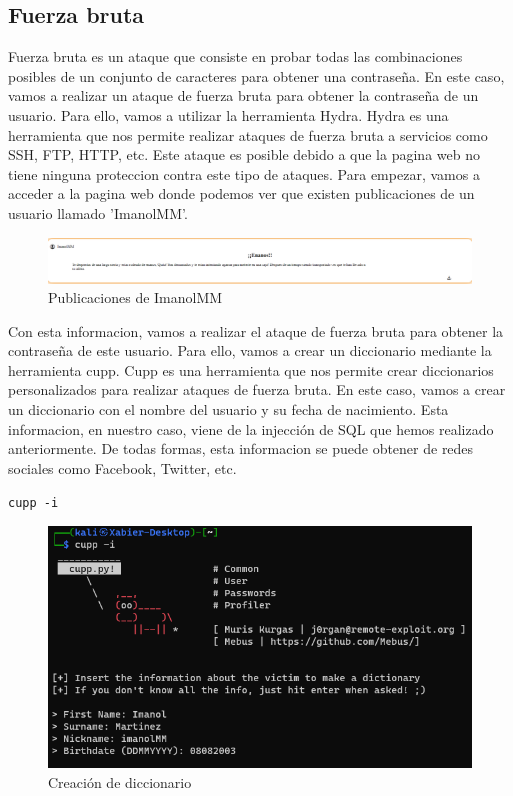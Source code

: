 \documentclass{report}
\begin{document}
            \subsection{Fuerza bruta}
                Fuerza bruta es un ataque que consiste en probar todas las combinaciones posibles de un conjunto de caracteres para obtener una contraseña.
                En este caso, vamos a realizar un ataque de fuerza bruta para obtener la contraseña de un usuario.
                Para ello, vamos a utilizar la herramienta Hydra.
                Hydra es una herramienta que nos permite realizar ataques de fuerza bruta a servicios como SSH, FTP, HTTP, etc.
                Este ataque es posible debido a que la pagina web no tiene ninguna proteccion contra este tipo de ataques.
                Para empezar, vamos a acceder a la pagina web donde podemos ver que existen publicaciones de un usuario llamado 'ImanolMM'.
                \begin{figure}[H]
                    \centering
                    \includegraphics[width=1\textwidth]{./img/vulnerabilidades/2.4/3.1.png}
                    \caption{Publicaciones de ImanolMM}
                \end{figure}
                Con esta informacion, vamos a realizar el ataque de fuerza bruta para obtener la contraseña de este usuario.
                Para ello, vamos a crear un diccionario mediante la herramienta cupp.
                Cupp es una herramienta que nos permite crear diccionarios personalizados para realizar ataques de fuerza bruta.
                En este caso, vamos a crear un diccionario con el nombre del usuario y su fecha de nacimiento.
                Esta informacion, en nuestro caso, viene de la injección de SQL que hemos realizado anteriormente.
                De todas formas, esta informacion se puede obtener de redes sociales como Facebook, Twitter, etc.
                \begin{center}
                    \texttt{cupp -i}
                \end{center}
                \begin{figure}[H]
                    \centering
                    \includegraphics[width=1\textwidth]{./img/vulnerabilidades/2.4/3.2.png}
                    \caption{Creación de diccionario}
                \end{figure}
\end{document}
